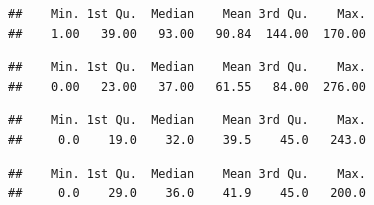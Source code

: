 \documentclass[12pt,]{article}
\newenvironment{Shaded}{\begin{snugshade}}{\end{snugshade}}
\newcommand{\KeywordTok}[1]{\textcolor[rgb]{0.13,0.29,0.53}{\textbf{#1}}}
\newcommand{\DecValTok}[1]{\textcolor[rgb]{0.00,0.00,0.81}{#1}}
\newcommand{\OperatorTok}[1]{\textcolor[rgb]{0.81,0.36,0.00}{\textbf{#1}}}
\newcommand{\NormalTok}[1]{#1}
\begin{document}
\begin{Shaded}
\end{Shaded}

\begin{verbatim}
##    Min. 1st Qu.  Median    Mean 3rd Qu.    Max. 
##    1.00   39.00   93.00   90.84  144.00  170.00
\end{verbatim}

\begin{Shaded}
\end{Shaded}

\begin{verbatim}
##    Min. 1st Qu.  Median    Mean 3rd Qu.    Max. 
##    0.00   23.00   37.00   61.55   84.00  276.00
\end{verbatim}

\begin{Shaded}
\end{Shaded}

\begin{verbatim}
##    Min. 1st Qu.  Median    Mean 3rd Qu.    Max. 
##     0.0    19.0    32.0    39.5    45.0   243.0
\end{verbatim}

\begin{Shaded}
\end{Shaded}

\begin{verbatim}
##    Min. 1st Qu.  Median    Mean 3rd Qu.    Max. 
##     0.0    29.0    36.0    41.9    45.0   200.0
\end{verbatim}

\begin{Shaded}
\end{Shaded}
\end{document}
